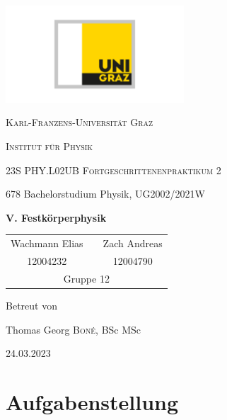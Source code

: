 \documentclass[ngerman]{scrartcl}
\begin{document}
\begin{titlepage}
    \centering
    \includegraphics[width=0.5\textwidth]{../../99_Misc/Logo_KF.pdf}\par\vspace{0.8cm}
    {\scshape\LARGE{Karl-Franzens-Universität Graz}\par}
    {\scshape\LARGE{Institut für Physik}\par}
    \vspace{1cm}
    {\scshape\Large{23S PHY.L02UB Fortgeschrittenenpraktikum 2}\par}
    678 Bachelorstudium Physik, UG2002/2021W\par
    \vspace{1.5cm}
    {\huge\bfseries V. Festkörperphysik\par}
    \vspace{2cm}
    \begin{table}[H]
        \centering
        \begin{tabular}{c c c}
            \Large Wachmann Elias &  & \Large Zach Andreas \\
            \Large 12004232       &  & \Large 12004790     \\
            \multicolumn{3}{c}{Gruppe 12}
        \end{tabular}
    \end{table}
    \vfill
    \Large Betreut von\par
    Thomas Georg \textsc{Boné}, BSc MSc
    \vfill
    {\large 24.03.2023\par}
\end{titlepage}

\clearpage
\tableofcontents
\newpage

\section[Aufgabenstellung]{Aufgabenstellung \cite{ref:angabe_elektronen,ref:angabe_esr}}
\label{sec:aufgabenstellung}
\end{document}

